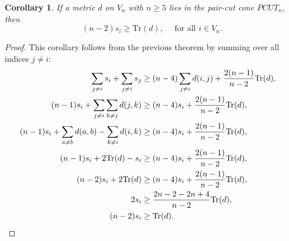 \documentclass[12pt]{amsart}
\numberwithin{theorem}{section}
\newtheorem{corollary}[theorem]{Corollary}
\theoremstyle{remark}
\begin{document}

\begin{corollary} \label{Corollary with main ineqaulity for PCUTn membership}
If a metric $d$ on $V_n$ with $n\ge 5$ lies in the pair-cut cone $PCUT_n$, then 
\begin{equation} \label{Secondary inequality on star-traces and traces of metrics in the pair-cut-cone}
 (n-2)s_i \ge  \text{Tr}(d), \quad \text{ for all } i\in V_n. 
 \end{equation}
\end{corollary}
\begin{proof}
This corollary follows from the previous theorem by summing over all indices $j\ne i$:
\begin{align*}
\sum_{j\ne i}s_i +   \sum_{j\ne i} s_j & \ge (n-4)\sum_{j\ne i} d(i,j) + \frac{2(n-1)}{n-2}\text{Tr}(d), \cr
(n-1)s_i +   \sum_{j\ne i} \sum_{k\ne j} d(j,k) & \ge (n-4)s_i + \frac{2(n-1)}{n-2}\text{Tr}(d), \cr
(n-1)s_i +   \sum_{a\ne b} d(a,b) - \sum_{k\ne i} d(i,k)  & \ge (n-4)s_i + \frac{2(n-1)}{n-2}\text{Tr}(d), \cr
(n-1)s_i +    2\text{Tr}(d) - s_i  & \ge (n-4)s_i + \frac{2(n-1)}{n-2}\text{Tr}(d), \cr
(n-2)s_i + 2\text{Tr}(d) & \ge (n-4)s_i + \frac{2(n-1)}{n-2}\text{Tr}(d), \cr
2s_i   & \ge   \frac{2n-2-2n+4}{n-2}\text{Tr}(d), \cr
(n-2)s_i   & \ge \text{Tr}(d).
\end{align*}
\end{proof}
\end{document}
